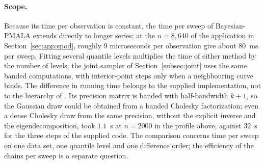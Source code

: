 \paragraph{Scope.} Because its time per observation is constant, the time per sweep of Bayesian-PMALA extends directly to longer series: at the $n = 8{,}640$ of the application in Section~\ref{sec:app:spod}, roughly $9$ microseconds per observation give about $80$~ms per sweep. Fitting several quantile levels multiplies the time of either method by the number of levels; the joint sampler of Section~\ref{subsec:joint} uses the same banded computations, with interior-point steps only when a neighbouring curve binds. The difference in running time belongs to the supplied implementation, not to the hierarchy of \citet{onizuka2024fast}. Its precision matrix is banded with half-bandwidth $k + 1$, so the Gaussian draw could be obtained from a banded Cholesky factorization; even a dense Cholesky draw from the same precision, without the explicit inverse and the eigendecomposition, took $1.1$~s at $n = 2000$ in the profile above, against $32$~s for the three steps of the supplied code. The comparison concerns time per sweep on one data set, one quantile level and one difference order; the efficiency of the chains per sweep is a separate question.
